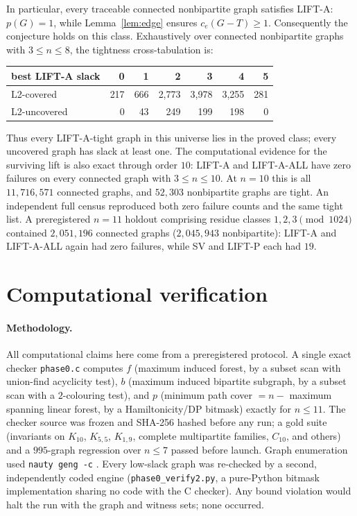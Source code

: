 \documentclass[11pt]{article}
\theoremstyle{plain}
\theoremstyle{definition}
\begin{document}
In particular, every traceable connected nonbipartite graph satisfies LIFT-A:
$p(G)=1$, while Lemma~\ref{lem:edge} ensures $c_e(G-T)\ge1$.  Consequently the
conjecture holds on this class.  Exhaustively over connected nonbipartite graphs
with $3\le n\le8$, the tightness cross-tabulation is:

\begin{center}
\begin{tabular}{l|rrrrrr}
best LIFT-A slack & 0 & 1 & 2 & 3 & 4 & 5\\
\hline
L2-covered   & 217 & 666 & 2,773 & 3,978 & 3,255 & 281\\
L2-uncovered & 0   & 43  & 249   & 199   & 198   & 0
\end{tabular}
\end{center}

Thus every LIFT-A-tight graph in this universe lies in the proved class; every
uncovered graph has slack at least one.  The computational evidence for the
surviving lift is also exact through order $10$: LIFT-A and LIFT-A-ALL have
zero failures on every connected graph with $3\le n\le10$.  At $n=10$ this is
all $11,716,571$ connected graphs, and $52,303$ nonbipartite graphs are tight.
An independent full census reproduced both zero failure counts and the same
tight list.  A preregistered $n=11$ holdout comprising residue classes
$1,2,3\pmod{1024}$ contained $2,051,196$ connected graphs
($2,045,943$ nonbipartite): LIFT-A and LIFT-A-ALL again had zero failures,
while SV and LIFT-P each had $19$.

\section{Computational verification}\label{sec:computation}

\paragraph{Methodology.} All computational claims here come from a preregistered
protocol. A single exact checker \texttt{phase0.c} computes $f$ (maximum induced
forest, by a subset scan with union-find acyclicity test), $b$ (maximum induced
bipartite subgraph, by a subset scan with a $2$-colouring test), and $p$ (minimum
path cover $=n-$ maximum spanning linear forest, by a Hamiltonicity/DP bitmask)
exactly for $n\le11$. The checker source was frozen and SHA-256 hashed before any
run; a gold suite (invariants on $K_{10}$, $K_{5,5}$, $K_{1,9}$, complete
multipartite families, $C_{10}$, and others) and a $995$-graph regression over
$n\le7$ passed before launch. Graph enumeration used \texttt{nauty geng -c}
\cite{nauty}.
Every low-slack graph was re-checked by a second, independently coded engine
(\texttt{phase0\_verify2.py}, a pure-Python bitmask implementation sharing no code
with the C checker). Any bound violation would halt the run with the graph and
witness sets; none occurred.
\end{document}
